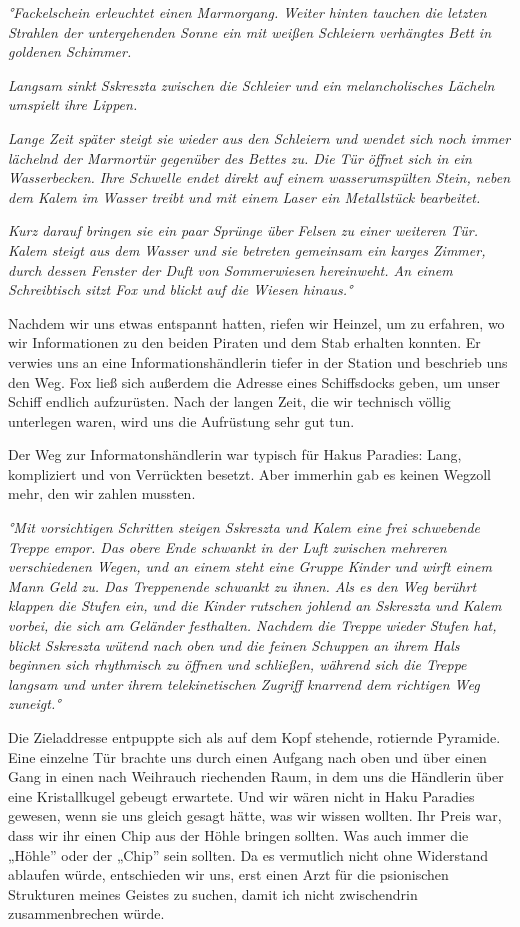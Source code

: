 \documentclass[11pt]{article}
\begin{document}
\emph{°Fackelschein erleuchtet einen Marmorgang. Weiter hinten tauchen
die letzten Strahlen der untergehenden Sonne ein mit weißen Schleiern
verhängtes Bett in goldenen Schimmer.}

\emph{Langsam sinkt Sskreszta zwischen die Schleier und ein
melancholisches Lächeln umspielt ihre Lippen.}

\emph{Lange Zeit später steigt sie wieder aus den Schleiern und wendet
sich noch immer lächelnd der Marmortür gegenüber des Bettes zu. Die Tür
öffnet sich in ein Wasserbecken. Ihre Schwelle endet direkt auf einem
wasserumspülten Stein, neben dem Kalem im Wasser treibt und mit einem
Laser ein Metallstück bearbeitet.}

\emph{Kurz darauf bringen sie ein paar Sprünge über Felsen zu einer
weiteren Tür. Kalem steigt aus dem Wasser und sie betreten gemeinsam ein
karges Zimmer, durch dessen Fenster der Duft von Sommerwiesen
hereinweht. An einem Schreibtisch sitzt Fox und blickt auf die Wiesen
hinaus.°}

Nachdem wir uns etwas entspannt hatten, riefen wir Heinzel, um zu
erfahren, wo wir Informationen zu den beiden Piraten und dem Stab
erhalten konnten. Er verwies uns an eine Informationshändlerin tiefer in
der Station und beschrieb uns den Weg. Fox ließ sich außerdem die
Adresse eines Schiffsdocks geben, um unser Schiff endlich aufzurüsten.
Nach der langen Zeit, die wir technisch völlig unterlegen waren, wird
uns die Aufrüstung sehr gut tun.

Der Weg zur Informatonshändlerin war typisch für Hakus Paradies: Lang,
kompliziert und von Verrückten besetzt. Aber immerhin gab es keinen
Wegzoll mehr, den wir zahlen mussten.

\emph{°Mit vorsichtigen Schritten steigen Sskreszta und Kalem eine frei
schwebende Treppe empor. Das obere Ende schwankt in der Luft zwischen
mehreren verschiedenen Wegen, und an einem steht eine Gruppe Kinder und
wirft einem Mann Geld zu. Das Treppenende schwankt zu ihnen. Als es den
Weg berührt klappen die Stufen ein, und die Kinder rutschen johlend an
Sskreszta und Kalem vorbei, die sich am Geländer festhalten. Nachdem die
Treppe wieder Stufen hat, blickt Sskreszta wütend nach oben und die
feinen Schuppen an ihrem Hals beginnen sich rhythmisch zu öffnen und
schließen, während sich die Treppe langsam und unter ihrem
telekinetischen Zugriff knarrend dem richtigen Weg zuneigt.°}

Die Zieladdresse entpuppte sich als auf dem Kopf stehende, rotiernde
Pyramide. Eine einzelne Tür brachte uns durch einen Aufgang nach oben
und über einen Gang in einen nach Weihrauch riechenden Raum, in dem uns
die Händlerin über eine Kristallkugel gebeugt erwartete. Und wir wären
nicht in Haku Paradies gewesen, wenn sie uns gleich gesagt hätte, was
wir wissen wollten. Ihr Preis war, dass wir ihr einen Chip aus der Höhle
bringen sollten. Was auch immer die „Höhle'' oder der „Chip'' sein
sollten. Da es vermutlich nicht ohne Widerstand ablaufen würde,
entschieden wir uns, erst einen Arzt für die psionischen Strukturen
meines Geistes zu suchen, damit ich nicht zwischendrin zusammenbrechen
würde.
\end{document}
